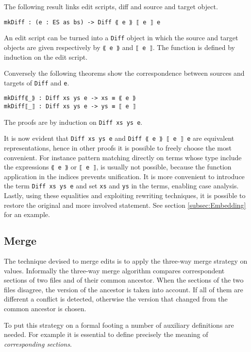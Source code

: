 \documentclass[../Thesis.tex]{subfiles}
\begin{document}
	The following result links edit scripts, diff and source and target object.
	
\begin{verbatim}	
mkDiff : (e : ES as bs) -> Diff ⟪ e ⟫ ⟦ e ⟧ e
\end{verbatim}

	An edit script can be turned into a \texttt{Diff} object in which the
	source and target objects are given respectively by \texttt{⟪ e ⟫} and 
	\texttt{⟦ e ⟧}.
	The function is defined by induction on the edit script.
	
	Conversely the following theorems show the correspondence
	between sources and targets of \texttt{Diff} and \texttt{e}. 

\begin{verbatim}
mkDiff⟪_⟫ : Diff xs ys e -> xs ≡ ⟪ e ⟫
mkDiff⟦_⟧ : Diff xs ys e -> ys ≡ ⟦ e ⟧
\end{verbatim}

	The proofs are by induction on \texttt{Diff xs ys e}.
	
	It is now evident that \texttt{Diff xs ys e} and \texttt{Diff  ⟪ e ⟫ ⟦ e ⟧ e} 
	are equivalent	representations, hence in other proofs it is possible to freely 
	choose the most convenient. 
	For instance pattern matching directly on terms whose type include 
	the expressions \texttt{⟪ e ⟫} or
	\texttt{⟦ e ⟧}, is usually not possible, because the function application
	in the indices prevents unification. 
	It is more convenient to introduce the term
	\texttt{Diff xs ys e} and set \texttt{xs} and \texttt{ys} in the terms, 
	enabling case analysis. Lastly, using 
	these equalities and exploiting rewriting techniques, it is possible
	to restore the original and more involved statement.
	See section \ref{subsec:Embedding} for an example.
	
	\subsection{Merge}	
	\label{subsec:Merge}
	The technique devised to merge edits is to apply the three-way
	merge strategy on values. 
	Informally the three-way merge algorithm compares correspondent sections 
	of two files and of their common ancestor.
	When the sections of the two files disagree, the version of the ancestor
	is taken into account. If all of them are different a conflict is detected,
	otherwise the version that changed from the common ancestor is chosen.
	
	To put this strategy on a formal footing a number of auxiliary definitions 
	are needed. For example it is essential to define precisely the meaning 
	of \emph{corresponding sections}. 
	
\end{document}

